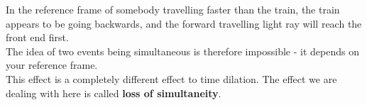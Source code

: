 \documentclass[main.tex]{subfiles}
\begin{document}
\begin{figure}[h]
	\begin{center}
		
		
	\end{center}
\end{figure}
In the reference frame of somebody travelling faster than the train, the train appears to be going backwards, and the forward travelling light ray will reach the front end first. 
\\
The idea of two events being simultaneous is therefore impossible - it depends on your reference frame.
\\

This effect is  a completely different effect to time dilation.  The effect we are dealing with here is called \textbf{loss of simultaneity}.
\end{document}
